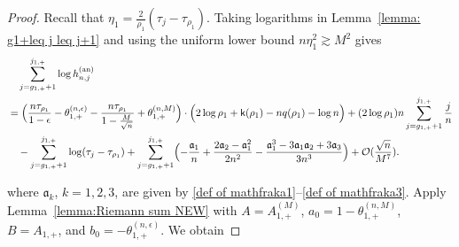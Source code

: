 \documentclass[a4paper]{article}
\numberwithin{equation}{section}
\begin{document}
\begin{proof}
Recall that $\eta_1=\frac{2}{\rho_1}(\tau_j-\tau_{\rho_1})$. Taking logarithms in Lemma~\ref{lemma: g1+leq j leq j+1} and using the uniform lower bound $n\eta_1^2\gtrsim M^2$ gives
\begin{align*}
&\quad \sum_{j=g_{1,+}+1}^{j_{1,+}}\log h_{n,j}^{(\mathrm{an})}
\\
&=
\Bigl(\frac{n\tau_{\rho_1}}{1-\epsilon}-\theta_{1,+}^{(n,\epsilon)}-\frac{n\tau_{\rho_1}}{1-\frac{M}{\sqrt{n}}}+\theta_{1,+}^{(n,M)}\Bigr)\cdot
\Bigl( 
2\log\rho_1+\mathsf{k}(\rho_1)-nq(\rho_1)-\log n
\Bigr)
+
(2\log\rho_1)n\sum_{j=g_{1,+}+1}^{j_{1,+}}\frac{j}{n}
\\
&\quad -\sum_{j=g_{1,+}+1}^{j_{1,+}}\log(\tau_j-\tau_{\rho_1})
+\sum_{j=g_{1,+}+1}^{j_{1,+}}\Bigl(
-\frac{\mathfrak{a}_1}{n}+\frac{2\mathfrak{a}_2-\mathfrak{a}_1^2}{2n^2}-\frac{\mathfrak{a}_1^3-3\mathfrak{a}_1\mathfrak{a}_2+3\mathfrak{a}_3}{3n^3}\Bigr)+\mathcal{O}(\frac{\sqrt{n}}{M^7}). 
\end{align*}    

where $\mathfrak a_k$, $k=1,2,3$, are given by \eqref{def of mathfraka1}--\eqref{def of mathfraka3}. Apply Lemma~\ref{lemma:Riemann sum NEW} with $A=A_{1,+}^{(M)}$, $a_0=1-\theta_{1,+}^{(n,M)}$, $B=A_{1,+}$, and $b_0=-\theta_{1,+}^{(n,\epsilon)}$. We obtain

\end{proof}
\end{document}
